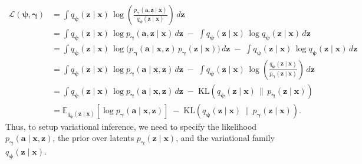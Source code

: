\begin{align}
\mathcal{L}(\boldsymbol{\psi},\boldsymbol{\gamma})
&= \int q_{\boldsymbol{\psi}}(\mathbf{z}\mid \mathbf{x})\,\log\!\left(\frac{p_{\boldsymbol{\gamma}}(\mathbf{a},\mathbf{z} \mid \mathbf{x})}{q_{\boldsymbol{\psi}}(\mathbf{z}\mid \mathbf{x})}\right)\, d\mathbf{z} \nonumber\\
&= \int q_{\boldsymbol{\psi}}(\mathbf{z}\mid \mathbf{x})\,\log p_{\boldsymbol{\gamma}}(\mathbf{a},\mathbf{z} \mid \mathbf{x})\, d\mathbf{z}
   \;-\; \int q_{\boldsymbol{\psi}}(\mathbf{z}\mid \mathbf{x})\,\log q_{\boldsymbol{\psi}}(\mathbf{z}\mid \mathbf{x})\, d\mathbf{z} \nonumber\\
&= \int q_{\boldsymbol{\psi}}(\mathbf{z}\mid \mathbf{x})\,\log\!\Big( p_{\boldsymbol{\gamma}}(\mathbf{a}\mid \mathbf{x},\mathbf{z})\,p_{\boldsymbol{\gamma}}(\mathbf{z}\mid \mathbf{x}) \Big)\, d\mathbf{z}
   \;-\; \int q_{\boldsymbol{\psi}}(\mathbf{z}\mid \mathbf{x})\,\log q_{\boldsymbol{\psi}}(\mathbf{z}\mid \mathbf{x})\, d\mathbf{z} \nonumber\\
&= \int q_{\boldsymbol{\psi}}(\mathbf{z}\mid \mathbf{x})\,\log p_{\boldsymbol{\gamma}}(\mathbf{a}\mid \mathbf{x},\mathbf{z})\, d\mathbf{z}
   \;-\; \int q_{\boldsymbol{\psi}}(\mathbf{z}\mid \mathbf{x})\,\log\!\left(\frac{q_{\boldsymbol{\psi}}(\mathbf{z}\mid \mathbf{x})}{p_{\boldsymbol{\gamma}}(\mathbf{z}\mid \mathbf{x})}\right)\, d\mathbf{z} \nonumber\\
&= \int q_{\boldsymbol{\psi}}(\mathbf{z}\mid \mathbf{x})\,\log p_{\boldsymbol{\gamma}}(\mathbf{a}\mid \mathbf{x},\mathbf{z})\, d\mathbf{z}
    \;-\; \mathrm{KL}\!\left(q_{\boldsymbol{\psi}}(\mathbf{z}\mid \mathbf{x})\,\|\,p_{\boldsymbol{\gamma}}(\mathbf{z}\mid \mathbf{x})\right)\nonumber\\
&= \mathbb{E}_{q_{\boldsymbol{\psi}}(\mathbf{z}\mid \mathbf{x})}\!\left[\log p_{\boldsymbol{\gamma}}(\mathbf{a}\mid \mathbf{x},\mathbf{z})\right]
    \;-\; \mathrm{KL}\!\left(q_{\boldsymbol{\psi}}(\mathbf{z}\mid \mathbf{x})\,\|\,p_{\boldsymbol{\gamma}}(\mathbf{z}\mid \mathbf{x})\right).
    \label{eq:elbo-rewrite}
\end{align}
Thus, to setup variational inference, we need to specify the likelihood 
\(p_{\boldsymbol{\gamma}}(\mathbf{a}\mid \mathbf{x},\mathbf{z})\), 
the prior over latents \(p_{\boldsymbol{\gamma}}(\mathbf{z}\mid \mathbf{x})\), 
and the variational family \(q_{\boldsymbol{\psi}}(\mathbf{z}\mid \mathbf{x})\).

